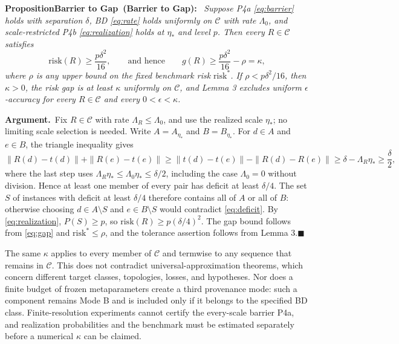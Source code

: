 \documentclass[twoside,11pt]{article}
\newenvironment{uprop}[1][]{\par\medskip\noindent\textbf{Proposition\ifx\relax#1\relax\else\ (#1)\fi:}\ \itshape}{\par\medskip} %
\newcommand{\argument}{\par\medskip\noindent\textbf{Argument.}\ }
\newcommand{\qedbox}{\hfill$\blacksquare$}
\begin{document}
\begin{uprop}[Barrier to Gap]
Suppose P4a \eqref{eq:barrier} holds with separation $\delta$, BD \eqref{eq:rate} holds uniformly on $\mathcal{C}$ with rate $\Lambda_0$, and scale-restricted P4b \eqref{eq:realization} holds at $\eta_*$ and level $p$. Then every $R\in\mathcal{C}$ satisfies
\begin{equation}
\mathrm{risk}(R)\geq\frac{p\delta^2}{16}, \qquad\text{and hence}\qquad g(R)\geq\frac{p\delta^2}{16}-\rho=\kappa,
\label{eq:floor}%
\end{equation}%
where $\rho$ is any upper bound on the fixed benchmark risk $\mathrm{risk}^*$. If $\rho<p\delta^2/16$, then $\kappa>0$, the risk gap is at least $\kappa$ uniformly on $\mathcal{C}$, and Lemma 3 excludes uniform $\epsilon$-accuracy for every $R\in\mathcal{C}$ and every $0<\epsilon<\kappa$.
\label{prop:barrier}%
\end{uprop}

\argument Fix $R\in\mathcal{C}$ with rate $\Lambda_R\leq\Lambda_0$, and use the realized scale $\eta_*$; no limiting scale selection is needed. Write $A=A_{\eta_*}$ and $B=B_{\eta_*}$. For $d\in A$ and $e\in B$, the triangle inequality gives
\begin{equation}
\|R(d)-t(d)\|+\|R(e)-t(e)\|\geq\|t(d)-t(e)\|-\|R(d)-R(e)\|\geq\delta-\Lambda_R\eta_*\geq\frac{\delta}{2},
\label{eq:deficit}%
\end{equation}%
where the last step uses $\Lambda_R\eta_*\leq\Lambda_0\eta_*\leq\delta/2$, including the case $\Lambda_0=0$ without division. Hence at least one member of every pair has deficit at least $\delta/4$. The set $S$ of instances with deficit at least $\delta/4$ therefore contains all of $A$ or all of $B$: otherwise choosing $d\in A\setminus S$ and $e\in B\setminus S$ would contradict \eqref{eq:deficit}. By \eqref{eq:realization}, $P(S)\geq p$, so $\mathrm{risk}(R)\geq p(\delta/4)^2$. The gap bound follows from \eqref{eq:gap} and $\mathrm{risk}^*\leq\rho$, and the tolerance assertion follows from Lemma 3.\qedbox

The same $\kappa$ applies to every member of $\mathcal{C}$ and termwise to any sequence that remains in $\mathcal{C}$. This does not contradict universal-approximation theorems, which concern different target classes, topologies, losses, and hypotheses. Nor does a finite budget of frozen metaparameters create a third provenance mode: such a component remains Mode B and is included only if it belongs to the specified BD class. Finite-resolution experiments cannot certify the every-scale barrier P4a, and realization probabilities and the benchmark must be estimated separately before a numerical $\kappa$ can be claimed.
\end{document}
